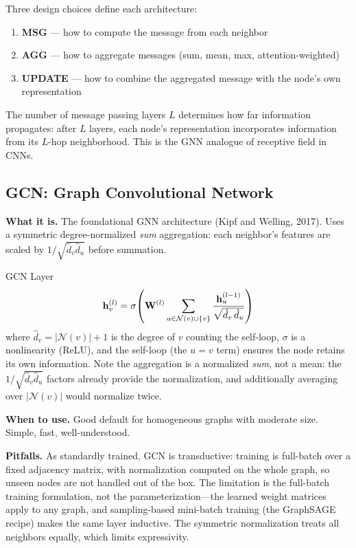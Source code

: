 Three design choices define each architecture:
\begin{enumerate}
    \item \textbf{MSG} --- how to compute the message from each neighbor
    \item \textbf{AGG} --- how to aggregate messages (sum, mean, max, attention-weighted)
    \item \textbf{UPDATE} --- how to combine the aggregated message with the node's own representation
\end{enumerate}

The number of message passing layers $L$ determines how far information propagates: after $L$ layers, each node's representation incorporates information from its $L$-hop neighborhood. This is the GNN analogue of receptive field in CNNs.

\subsection{GCN: Graph Convolutional Network}

\textbf{What it is.} The foundational GNN architecture (Kipf and Welling, 2017). Uses a symmetric degree-normalized \textit{sum} aggregation: each neighbor's features are scaled by $1/\sqrt{\hat{d}_v \hat{d}_u}$ before summation.

\begin{mathresult}{GCN Layer}
\begin{equation}
\mathbf{h}_v^{(l)} = \sigma\!\left(\mathbf{W}^{(l)} \sum_{u \in \mathcal{N}(v) \cup \{v\}} \frac{\mathbf{h}_u^{(l-1)}}{\sqrt{\hat{d}_v\,\hat{d}_u}}\right)
\label{eq:gcn}
\end{equation}
where $\hat{d}_v = |\mathcal{N}(v)| + 1$ is the degree of $v$ counting the self-loop, $\sigma$ is a nonlinearity (ReLU), and the self-loop (the $u = v$ term) ensures the node retains its own information. Note the aggregation is a normalized \textit{sum}, not a mean: the $1/\sqrt{\hat{d}_v \hat{d}_u}$ factors already provide the normalization, and additionally averaging over $|\mathcal{N}(v)|$ would normalize twice.
\end{mathresult}

\textbf{When to use.} Good default for homogeneous graphs with moderate size. Simple, fast, well-understood.

\textbf{Pitfalls.} As standardly trained, GCN is transductive: training is full-batch over a fixed adjacency matrix, with normalization computed on the whole graph, so unseen nodes are not handled out of the box. The limitation is the full-batch training formulation, not the parameterization---the learned weight matrices apply to any graph, and sampling-based mini-batch training (the GraphSAGE recipe) makes the same layer inductive. The symmetric normalization treats all neighbors equally, which limits expressivity.

